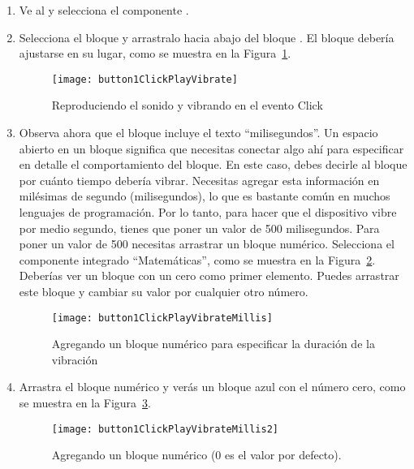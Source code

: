 \begin{enumerate}

\item Ve al \blockEditor y selecciona el componente .

\item Selecciona el bloque  y arrastralo hacia abajo del bloque . El bloque debería ajustarse en su lugar, como se muestra en la Figura~\ref{fig:button1ClickPlayVibrate}.

  \begin{figure}[H]
    \centering
    \texttt{[image: button1ClickPlayVibrate]}
    \caption{Reproduciendo el sonido y vibrando en el evento Click}
    \label{fig:button1ClickPlayVibrate}
  \end{figure}


\item Observa ahora que el bloque  incluye el texto ``milisegundos''. Un espacio abierto en un bloque significa que necesitas conectar algo ahí para especificar en detalle el comportamiento del bloque. En este caso, debes decirle al bloque por cuánto tiempo debería vibrar. Necesitas agregar esta información en milésimas de segundo (milisegundos), lo que es bastante común en muchos lenguajes de programación. Por lo tanto, para hacer que el dispositivo vibre por medio segundo, tienes que poner un valor de 500 milisegundos. Para poner un valor de 500 necesitas arrastrar un bloque numérico. Selecciona el componente integrado ``Matemáticas'', como se muestra en la Figura~\ref{fig:button1ClickPlayVibrateMillis}. Deberías ver un bloque con un cero como primer elemento. Puedes arrastrar este bloque y cambiar su valor por cualquier otro número.

  \begin{figure}[H]
    \centering
    \texttt{[image: button1ClickPlayVibrateMillis]}
    \caption{Agregando un bloque numérico para especificar la duración de la vibración}
    \label{fig:button1ClickPlayVibrateMillis}
  \end{figure}

\item Arrastra el bloque numérico y verás un bloque azul con el número cero, como se muestra en la Figura~\ref{fig:button1ClickPlayVibrateMillis2}.

  \begin{figure}[H]
    \centering
    \texttt{[image: button1ClickPlayVibrateMillis2]}
    \caption{Agregando un bloque numérico (0 es el valor por defecto).}
    \label{fig:button1ClickPlayVibrateMillis2}
  \end{figure}


\end{enumerate}
